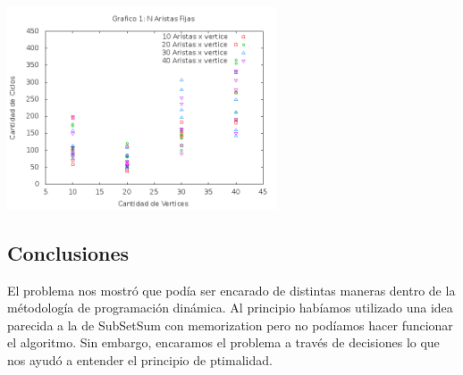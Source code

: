 \begin {center}
\includegraphics[width=8cm]{./graficos/grafico_efijo.png}
\end {center} 


\subsection{Conclusiones}
El problema nos mostró que podía ser encarado de distintas maneras dentro de la métodología de programación dinámica. Al principio habíamos utilizado una idea parecida a la de SubSetSum con memorization pero no podíamos hacer funcionar el algoritmo. Sin embargo, encaramos el problema a través de decisiones lo que nos ayudó a entender el principio de ptimalidad.
